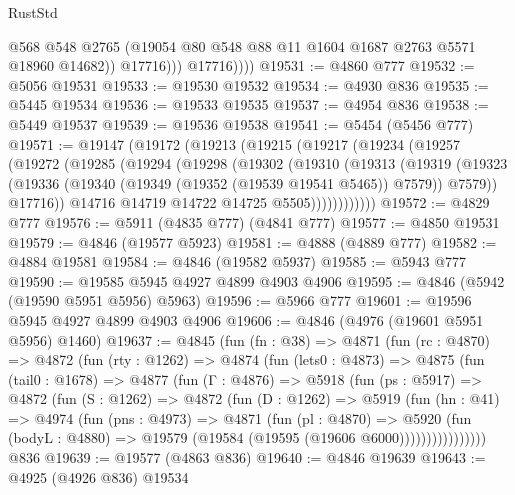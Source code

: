 \begin{lexlean}{RustStd}
\begin{coremodule}
                    @568
                    @548
                    @2765
                    (@19054 @80 @548 @88 @11 @1604 @1687 @2763 @5571 @18960 @14682))
                  @17716)))
            @17716))))
@19531 := @4860 @777
@19532 := @5056 @19531
@19533 := @19530 @19532
@19534 := @4930 @836
@19535 := @5445 @19534
@19536 := @19533 @19535
@19537 := @4954 @836
@19538 := @5449 @19537
@19539 := @19536 @19538
@19541 := @5454 (@5456 @777)
@19571 := @19147
    (@19172
      (@19213
        (@19215
          (@19217
            (@19234
              (@19257
                (@19272
                  (@19285
                    (@19294
                      (@19298
                        (@19302
                          (@19310
                            (@19313
                              (@19319
                                (@19323
                                  (@19336
                                    (@19340 (@19349 (@19352 (@19539 @19541 @5465)) @7579))
                                    @7579))
                                @17716))
                            @14716
                            @14719
                            @14722
                            @14725
                            @5505))))))))))))
@19572 := @4829 @777
@19576 := @5911 (@4835 @777) (@4841 @777)
@19577 := @4850 @19531
@19579 := @4846 (@19577 @5923)
@19581 := @4888 (@4889 @777)
@19582 := @4884 @19581
@19584 := @4846 (@19582 @5937)
@19585 := @5943 @777
@19590 := @19585 @5945 @4927 @4899 @4903 @4906
@19595 := @4846 (@5942 (@19590 @5951 @5956) @5963)
@19596 := @5966 @777
@19601 := @19596 @5945 @4927 @4899 @4903 @4906
@19606 := @4846 (@4976 (@19601 @5951 @5956) @1460)
@19637 := @4845
    (fun (fn : @38) =>
    @4871
      (fun (rc : @4870) =>
      @4872
        (fun (rty : @1262) =>
        @4874
          (fun (lets0 : @4873) =>
          @4875
            (fun (tail0 : @1678) =>
            @4877
              (fun (Γ : @4876) =>
              @5918
                (fun (ps : @5917) =>
                @4872
                  (fun (S : @1262) =>
                  @4872
                    (fun (D : @1262) =>
                    @5919
                      (fun (hn : @41) =>
                      @4974
                        (fun (pns : @4973) =>
                        @4871
                          (fun (pl : @4870) =>
                          @5920
                            (fun (bodyL : @4880) =>
                            @19579 (@19584 (@19595 (@19606 @6000))))))))))))))))
    @836
@19639 := @19577 (@4863 @836)
@19640 := @4846 @19639
@19643 := @4925 (@4926 @836) @19534

\end{coremodule}
\end{lexlean}

